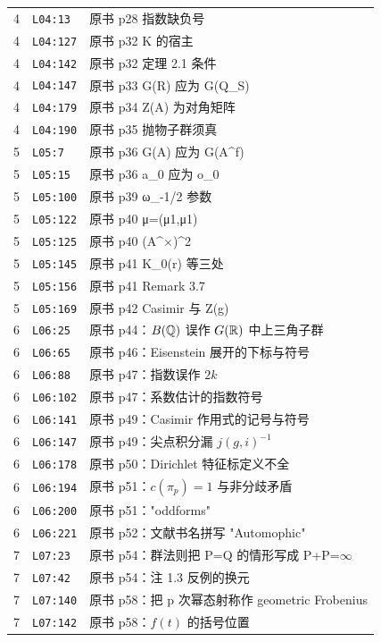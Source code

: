 \begin{longtable}{@{}p{1.0cm}p{2.2cm}p{10.6cm}@{}}
4 & \texttt{L04:13} & 原书 p28 指数缺负号 \\
4 & \texttt{L04:127} & 原书 p32 K 的宿主 \\
4 & \texttt{L04:142} & 原书 p32 定理 2.1 条件 \\
4 & \texttt{L04:147} & 原书 p33 G(R) 应为 G(Q\_S) \\
4 & \texttt{L04:179} & 原书 p34 Z(A) 为对角矩阵 \\
4 & \texttt{L04:190} & 原书 p35 抛物子群须真 \\
5 & \texttt{L05:7} & 原书 p36 G(A) 应为 G(A\^{}f) \\
5 & \texttt{L05:15} & 原书 p36 a\_0 应为 o\_0 \\
5 & \texttt{L05:100} & 原书 p39 ω\_{-1/2} 参数 \\
5 & \texttt{L05:122} & 原书 p40 μ=(μ1,μ1) \\
5 & \texttt{L05:125} & 原书 p40 (A\^{}$\times$)\^{}2 \\
5 & \texttt{L05:145} & 原书 p41 K\_0(r) 等三处 \\
5 & \texttt{L05:156} & 原书 p41 Remark 3.7 \\
5 & \texttt{L05:169} & 原书 p42 Casimir 与 Z(g) \\
6 & \texttt{L06:25} & 原书 p44：$B(\mathbb{Q})$ 误作 $G(\mathbb{R})$ 中上三角子群 \\
6 & \texttt{L06:65} & 原书 p46：Eisenstein 展开的下标与符号 \\
6 & \texttt{L06:88} & 原书 p47：指数误作 $2k$ \\
6 & \texttt{L06:102} & 原书 p47：系数估计的指数符号 \\
6 & \texttt{L06:141} & 原书 p49：Casimir 作用式的记号与符号 \\
6 & \texttt{L06:147} & 原书 p49：尖点积分漏 $j(g,i)^{-1}$ \\
6 & \texttt{L06:178} & 原书 p50：Dirichlet 特征标定义不全 \\
6 & \texttt{L06:194} & 原书 p51：$c(\pi_p)=1$ 与非分歧矛盾 \\
6 & \texttt{L06:200} & 原书 p51："oddforms" \\
6 & \texttt{L06:221} & 原书 p52：文献书名拼写 "Automophic" \\
7 & \texttt{L07:23} & 原书 p54：群法则把 P=Q 的情形写成 P+P=$\infty$ \\
7 & \texttt{L07:42} & 原书 p54：注 1.3 反例的换元 \\
7 & \texttt{L07:140} & 原书 p58：把 p 次幂态射称作 geometric Frobenius \\
7 & \texttt{L07:142} & 原书 p58：$f(t)$ 的括号位置 \\

\end{longtable}
